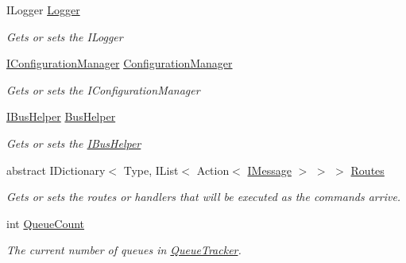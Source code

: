 \begin{DoxyCompactItemize}
I\+Logger \hyperlink{classCqrs_1_1Bus_1_1QueuedCommandBusReceiver_a0d0174c10f6cde11cd5a9d76092f3058_a0d0174c10f6cde11cd5a9d76092f3058}{Logger}
\begin{DoxyCompactList}\small\item\em Gets or sets the I\+Logger \end{DoxyCompactList}\item 
\hyperlink{interfaceCqrs_1_1Configuration_1_1IConfigurationManager}{I\+Configuration\+Manager} \hyperlink{classCqrs_1_1Bus_1_1QueuedCommandBusReceiver_acd7c3367d16742abd5e650f6bacf4df9_acd7c3367d16742abd5e650f6bacf4df9}{Configuration\+Manager}
\begin{DoxyCompactList}\small\item\em Gets or sets the I\+Configuration\+Manager \end{DoxyCompactList}\item 
\hyperlink{interfaceCqrs_1_1Bus_1_1IBusHelper}{I\+Bus\+Helper} \hyperlink{classCqrs_1_1Bus_1_1QueuedCommandBusReceiver_acc1fa8c5074a43382bcf21805b4ee709_acc1fa8c5074a43382bcf21805b4ee709}{Bus\+Helper}
\begin{DoxyCompactList}\small\item\em Gets or sets the \hyperlink{interfaceCqrs_1_1Bus_1_1IBusHelper}{I\+Bus\+Helper} \end{DoxyCompactList}\item 
abstract I\+Dictionary$<$ Type, I\+List$<$ Action$<$ \hyperlink{interfaceCqrs_1_1Messages_1_1IMessage}{I\+Message} $>$ $>$ $>$ \hyperlink{classCqrs_1_1Bus_1_1QueuedCommandBusReceiver_ad69fe38758694599261bad82e6c6378c_ad69fe38758694599261bad82e6c6378c}{Routes}
\begin{DoxyCompactList}\small\item\em Gets or sets the routes or handlers that will be executed as the commands arrive. \end{DoxyCompactList}\item 
int \hyperlink{classCqrs_1_1Bus_1_1QueuedCommandBusReceiver_aefae09fd32d799ac59d35eb706f76654_aefae09fd32d799ac59d35eb706f76654}{Queue\+Count}
\begin{DoxyCompactList}\small\item\em The current number of queues in \hyperlink{classCqrs_1_1Bus_1_1QueuedCommandBusReceiver_a2fc62989429929acd8ea66808a8c4a78_a2fc62989429929acd8ea66808a8c4a78}{Queue\+Tracker}. \end{DoxyCompactList}\item 

\end{DoxyCompactItemize}
